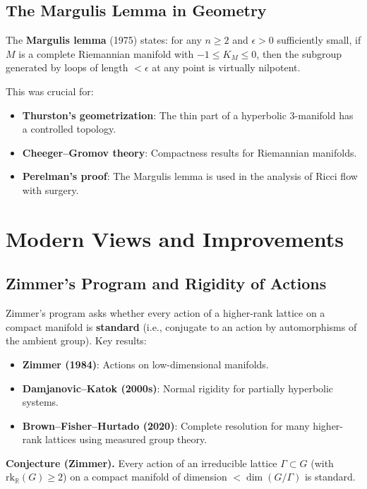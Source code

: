 \subsection{The Margulis Lemma in Geometry}

The \textbf{Margulis lemma} (1975) states: for any $n \geq 2$ and
$\epsilon > 0$ sufficiently small, if $M$ is a complete Riemannian
manifold with $-1 \leq K_M \leq 0$, then the subgroup generated by
loops of length $< \epsilon$ at any point is virtually nilpotent.

This was crucial for:
\begin{itemize}
\item \textbf{Thurston's geometrization}: The thin part of a
hyperbolic 3-manifold has a controlled topology.
\item \textbf{Cheeger--Gromov theory}: Compactness results for
Riemannian manifolds.
\item \textbf{Perelman's proof}: The Margulis lemma is used in the
analysis of Ricci flow with surgery.
\end{itemize}

\section{Modern Views and Improvements}

\subsection{Zimmer's Program and Rigidity of Actions}

Zimmer's program asks whether every action of a higher-rank lattice on
a compact manifold is \textbf{standard} (i.e., conjugate to an action
by automorphisms of the ambient group). Key results:

\begin{itemize}
\item \textbf{Zimmer (1984)}: Actions on low-dimensional manifolds.
\item \textbf{Damjanovic--Katok (2000s)}: Normal rigidity for
partially hyperbolic systems.
\item \textbf{Brown--Fisher--Hurtado (2020)}: Complete resolution for
many higher-rank lattices using measured group theory.
\end{itemize}

\textbf{Conjecture (Zimmer).} Every action of an irreducible lattice
$\Gamma \subset G$ (with $\mathrm{rk}_{\mathbb{R}}(G) \geq 2$) on a
compact manifold of dimension $< \dim(G/\Gamma)$ is standard.

